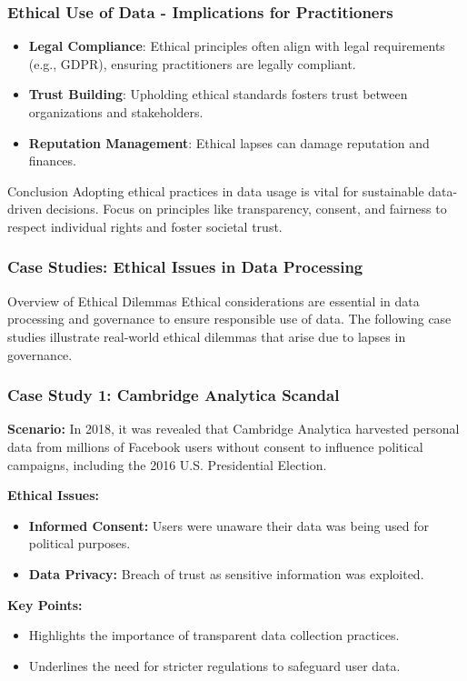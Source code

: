\documentclass[aspectratio=169]{beamer}
\begin{document}
\begin{frame}[fragile]
    \frametitle{Ethical Use of Data - Implications for Practitioners}
    \begin{itemize}
        \item \textbf{Legal Compliance}: Ethical principles often align with legal requirements 
        (e.g., GDPR), ensuring practitioners are legally compliant.
        
        \item \textbf{Trust Building}: Upholding ethical standards fosters trust between 
        organizations and stakeholders.
        
        \item \textbf{Reputation Management}: Ethical lapses can damage reputation and finances.
    \end{itemize}

    \begin{block}{Conclusion}
        Adopting ethical practices in data usage is vital for sustainable data-driven decisions. 
        Focus on principles like transparency, consent, and fairness to respect individual rights 
        and foster societal trust.
    \end{block}
\end{frame}

\begin{frame}[fragile]
    \frametitle{Case Studies: Ethical Issues in Data Processing}
    \begin{block}{Overview of Ethical Dilemmas}
        Ethical considerations are essential in data processing and governance to ensure responsible use of data. The following case studies illustrate real-world ethical dilemmas that arise due to lapses in governance.
    \end{block}
\end{frame}

\begin{frame}[fragile]
    \frametitle{Case Study 1: Cambridge Analytica Scandal}
    \textbf{Scenario:} In 2018, it was revealed that Cambridge Analytica harvested personal data from millions of Facebook users without consent to influence political campaigns, including the 2016 U.S. Presidential Election.

    \textbf{Ethical Issues:}
    \begin{itemize}
        \item \textbf{Informed Consent:} Users were unaware their data was being used for political purposes.
        \item \textbf{Data Privacy:} Breach of trust as sensitive information was exploited.
    \end{itemize}

    \textbf{Key Points:}
    \begin{itemize}
        \item Highlights the importance of transparent data collection practices.
        \item Underlines the need for stricter regulations to safeguard user data.
    \end{itemize}
\end{frame}
\end{document}
